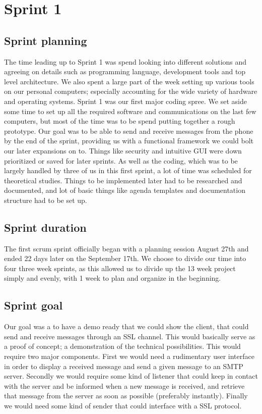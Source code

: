 

\chapter{Sprint 1}

\section{Sprint planning}
The time leading up to Sprint 1 was spend looking into different solutions and agreeing on details such as programming language, development tools and top level architecture. We also spent a large part of the week setting up various tools on our personal computers; especially accounting for the wide variety of hardware and operating systems.
\newline
\newline
Sprint 1 was our first major coding spree. We set aside some time to set up all the required software and communications on the last few computers, but most of the time was to be spend putting together a rough prototype. Our goal was to be able to send and receive messages from the phone by the end of the sprint, providing us with a functional framework we could bolt our later expansions on to. Things like security and intuitive GUI were down prioritized or saved for later sprints.
\newline
\newline
As well as the coding, which was to be largely handled by three of us in this first sprint, a lot of time was scheduled for theoretical studies. Things to be implemented later had to be researched and documented, and lot of basic things like agenda templates and documentation structure had to be set up.

\section{Sprint duration}
The first scrum sprint officially began with a planning session August 27th and ended 22 days later on the September 17th. We choose to divide our time into four three week sprints, as this allowed us to divide up the 13 week project simply and evenly, with 1 week to plan and organize in the beginning.

\section{Sprint goal}
Our goal was a to have a demo ready that we could show the client, that could send and receive messages through an SSL channel. This would basically serve as a proof of concept; a demonstration of the technical possibilities. This would require two major components. First we would need a rudimentary user interface in order to display a received message and send a given message to an SMTP server. Secondly we would require some kind of listener that could keep in contact with the server and be informed when a new message is received, and retrieve that message from the server as soon as possible (preferably instantly). Finally we would need some kind of sender that could interface with a SSL protocol.

